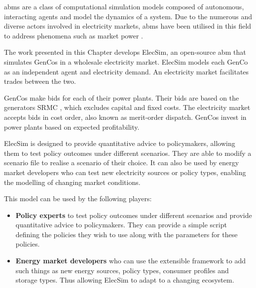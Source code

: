 \acrfull{abms} are a class of computational simulation models composed of autonomous, interacting agents and model the dynamics of a system. Due to the numerous and diverse actors involved in electricity markets, \acrshort{abms} have been utilised in this field to address phenomena such as market power \cite{Ringler2016a}. 

The work presented in this Chapter develops ElecSim, an open-source \acrshort{abm} that simulates GenCos in a wholesale electricity market. ElecSim models each GenCo as an independent agent and electricity demand. An electricity market facilitates trades between the two. 

GenCos make bids for each of their power plants. Their bids are based on the generators \gls{SRMC} \cite{Perloff2012}, which excludes capital and fixed costs. The electricity market accepts bids in cost order, also known as merit-order dispatch. GenCos invest in power plants based on expected profitability.	

ElecSim is designed to provide quantitative advice to policymakers, allowing them to test policy outcomes under different scenarios. They are able to modify a scenario file to realise a scenario of their choice. It can also be used by energy market developers who can test new electricity sources or policy types, enabling the modelling of changing market conditions.

This model can be used by the following players:

\begin{itemize}
	\item {\bf Policy experts} to test policy outcomes under different scenarios and provide quantitative advice to policymakers. They can provide a simple script defining the policies they wish to use along with the parameters for these policies.
	\item {\bf Energy market developers} who can use the extensible framework to add such things as new energy sources, policy types, consumer profiles and storage types. Thus allowing ElecSim to adapt to a changing ecosystem.
\end{itemize}





